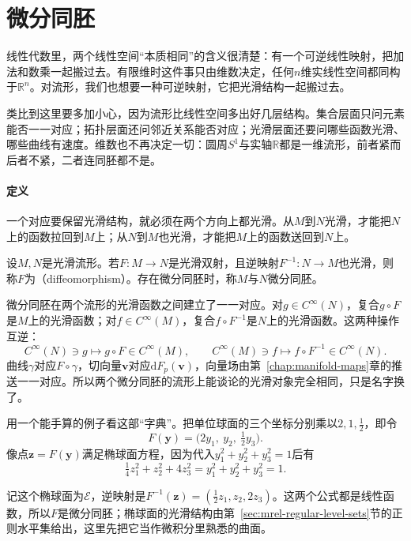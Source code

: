 \section{微分同胚}
\label{sec:mrel-diffeomorphisms}

线性代数里，两个线性空间“本质相同”的含义很清楚：有一个可逆线性映射，把加法和数乘一起搬过去。有限维时这件事只由维数决定，任何$n$维实线性空间都同构于$\mathbb R^n$。对流形，我们也想要一种可逆映射，它把光滑结构一起搬过去。

类比到这里要多加小心，因为流形比线性空间多出好几层结构。集合层面只问元素能否一一对应；拓扑层面还问邻近关系能否对应；光滑层面还要问哪些函数光滑、哪些曲线有速度。维数也不再决定一切：圆周$S^1$与实轴$\mathbb R$都是一维流形，前者紧而后者不紧，二者连同胚都不是。

\paragraph{定义}
一个对应要保留光滑结构，就必须在两个方向上都光滑。从$M$到$N$光滑，才能把$N$上的函数拉回到$M$上；从$N$到$M$也光滑，才能把$M$上的函数送回到$N$上。

\begin{definition}[微分同胚]
\label{def:mrel-diffeomorphism}
设$M,N$是光滑流形。若$F:M\to N$是光滑双射，且逆映射$F^{-1}:N\to M$也光滑，则称$F$为（diffeomorphism）。存在微分同胚时，称$M$与$N$微分同胚。
\end{definition}

微分同胚在两个流形的光滑函数之间建立了一一对应。对$g\in C^\infty(N)$，复合$g\circ F$是$M$上的光滑函数；对$f\in C^\infty(M)$，复合$f\circ F^{-1}$是$N$上的光滑函数。这两种操作互逆：
\begin{equation}
C^\infty(N)\ni g\longmapsto g\circ F\in C^\infty(M),\qquad
C^\infty(M)\ni f\longmapsto f\circ F^{-1}\in C^\infty(N).
\label{eq:mrel-function-dictionary}
\end{equation}
曲线$\gamma$对应$F\circ\gamma$，切向量$\bm v$对应$\mathrm dF_p(\bm v)$，向量场由第~\ref{chap:manifold-maps}章的推送一一对应。所以两个微分同胚的流形上能谈论的光滑对象完全相同，只是名字换了。

用一个能手算的例子看这部“字典”。把单位球面的三个坐标分别乘以$2,1,\tfrac12$，即令
\[
F(\bm y)=\bigl(2y_1,\ y_2,\ \tfrac12y_3\bigr).
\]
像点$\bm z=F(\bm y)$满足椭球面方程，因为代入$y_1^2+y_2^2+y_3^2=1$后有
\[
\tfrac14z_1^2+z_2^2+4z_3^2=y_1^2+y_2^2+y_3^2=1.
\]

记这个椭球面为$\mathcal E$，逆映射是$F^{-1}(\bm z)=(\tfrac12z_1,z_2,2z_3)$。这两个公式都是线性函数，所以$F$是微分同胚；椭球面的光滑结构由第~\ref{sec:mrel-regular-level-sets}节的正则水平集给出，这里先把它当作微积分里熟悉的曲面。

